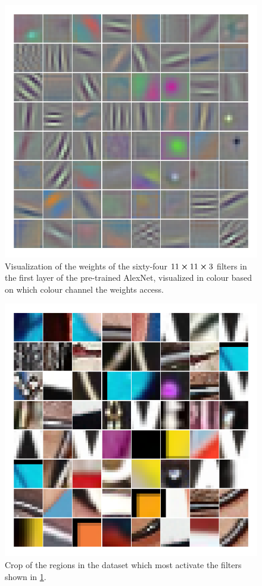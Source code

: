 \documentclass{article}
\begin{document}
\begin{figure}
	\includegraphics[width=\linewidth]{layer_1_weights}
	\caption{Visualization of the weights of the sixty-four \(11 \cross 11 \cross 3\) filters in the first layer of the pre-trained AlexNet, visualized in colour based on which colour channel the weights access.}
	\label{fig:layer1 weight}
\end{figure}
\begin{figure}
	\includegraphics[width=\linewidth]{layer1_activate}
	\caption{Crop of the regions in the dataset which most activate the filters shown in \cref{fig:layer1 weight}.}
	\label{fig:layer1 activate}
\end{figure}
\end{document}
